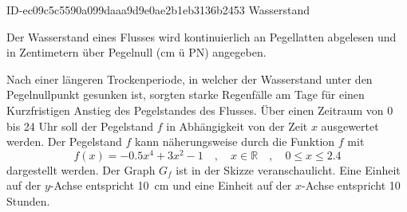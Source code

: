 \begin{exercise}
      {ID-ec09c5c5590a099daaa9d9e0ae2b1eb3136b2453}
      {Wasserstand}
  \ifproblem\problem\par
    Der Wasserstand eines Flusses wird
    kontinuierlich an Pegellatten abgelesen
    und in Zentimetern über Pegelnull
    (cm ü PN) angegeben.
    \par
    Nach einer längeren Trockenperiode,
    in welcher der Wasserstand unter
    den Pegelnullpunkt gesunken ist,
    sorgten starke Regenfälle am
    Tage für einen Kurzfristigen
    Anstieg des Pegelstandes des Flusses.
    Über einen Zeitraum von 0 bis 24 Uhr
    soll der Pegelstand $f$ in Abhängigkeit
    von der Zeit $x$ ausgewertet werden.
    Der Pegelstand $f$ kann näherungsweise
    durch die Funktion $f$ mit
    \begin{equation*}
      f(x)=-\num{0.5}x^4+\num{3}x^2-\num{1}
      \quad,\quad
      x\in\mathbb{R}
      \quad,\quad
      0\leq x\leq\num{2.4}
    \end{equation*}
    dargestellt werden. Der Graph $G_f$ ist in der
    Skizze veranschaulicht. Eine Einheit auf der
    $y$-Achse entspricht \SI{10}{\centi\metre} und
    eine Einheit auf der $x$-Achse entspricht
    10 Stunden.
    \begin{center}
\end{center}
\end{exercise}
